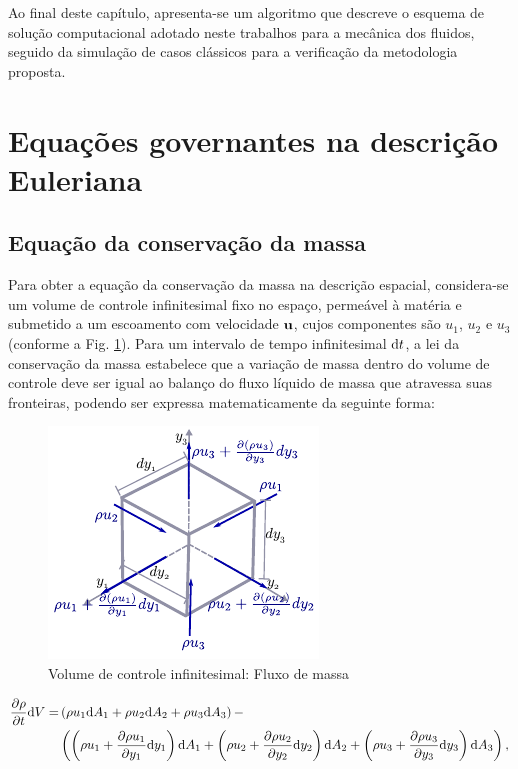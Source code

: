 \documentclass[tese_patricia]{subfiles}%
\begin{document}
Ao final deste capítulo, apresenta-se um algoritmo que descreve o esquema de solução computacional adotado neste trabalhos para a mecânica dos fluidos, seguido da simulação de casos clássicos para a verificação da metodologia proposta.

\section{Equações governantes na descrição Euleriana} 


\subsection{Equação da conservação da massa}

Para obter a equação da conservação da massa na descrição espacial, considera-se um volume de controle infinitesimal fixo no espaço, permeável à matéria e submetido a um escoamento com velocidade $\mathbf{u}$, cujos componentes são $u_1$, $u_2$ e $u_3$ (conforme a Fig. \ref{fig:volInf_fluxoMassa}). Para um intervalo de tempo infinitesimal $\mathrm{d} t$, a lei da conservação da massa estabelece que a variação de massa dentro do volume de controle deve ser igual ao balanço do fluxo líquido de massa que atravessa suas fronteiras, podendo ser expressa matematicamente da seguinte forma:

\begin{figure}[htb!]
	\centering 
	\includegraphics[scale=1.5,trim=0cm 0.0cm 0cm 0.0cm, clip=true]{Imagens/Cap2/volInf_fluxoMassa.pdf}	
	\caption{Volume de controle infinitesimal: Fluxo de massa}
	\label{fig:volInf_fluxoMassa}
\end{figure}


\begin{align}
	\begin{split}
	\frac{\partial \rho}{\partial t}\mathrm{d} V =& \left(\rho u_1 \mathrm{d} A_{1}  +  \rho u_2 \mathrm{d} A_{2} + \rho u_3  \mathrm{d} A_{3} \right) - \\  &\left(\left(\rho u_1 + \frac{\partial \rho u_1}{\partial y_1}\mathrm{d} y_1 \right)\mathrm{d} A_{1} + \left(\rho u_2+ \frac{\partial \rho u_2}{\partial y_2}\mathrm{d} y_2 \right) \mathrm{d} A_{2} + \left(\rho u_3 + \frac{\partial \rho u_3}{\partial y_3}\mathrm{d} y_3 \right) \mathrm{d} A_{3}\right), \label{eq:conser_massa_0} 
	\end{split}
\end{align}
\end{document}
